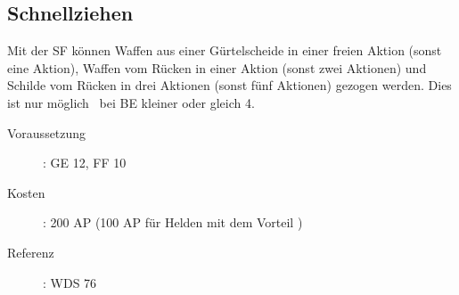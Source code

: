 \subsection{Schnellziehen}
\label{sf.schnellziehen}
Mit der SF  können Waffen aus einer Gürtelscheide in einer freien Aktion (sonst eine Aktion), Waffen vom Rücken in einer Aktion (sonst zwei Aktionen) und Schilde vom Rücken in drei Aktionen (sonst fünf Aktionen) gezogen werden.
Dies ist nur möglich \ bei BE kleiner oder gleich 4.
\begin{description}
    \item[Voraussetzung]:
        GE 12, FF 10
    \item [Kosten]:
        200 AP (100 AP für Helden mit dem Vorteil )
    \item [Referenz]:
        WDS 76
\end{description}
